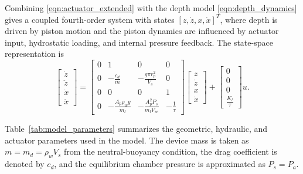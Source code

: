 ﻿\documentclass[subscriptcorrection,upint,varvw,barcolor=Goldenrod3,mathalfa=cal=euler,balance,hyphenate,french,pdf-a]{asmejour}
\begin{document}
Combining \eqref{eqn:actuator_extended} with the depth model \eqref{eqn:depth_dynamics} gives a coupled fourth-order system with states $[z,\dot{z},x,\dot{x}]^T$, where depth is driven by piston motion and the piston dynamics are influenced by actuator input, hydrostatic loading, and internal pressure feedback. The state-space representation is
\begin{equation}
    \label{eqn:state_space}
    \begin{bmatrix}\dot{z} \\ \ddot{z} \\ \dot{x} \\ \ddot{x}\end{bmatrix} =
    \begin{bmatrix}0 & 1 & 0 & 0 \\
0 & -\frac{c_d}{m} & -\frac{g\pi r_p^2}{V_s} & 0 \\
0 & 0 & 0 & 1 \\
0 & -\frac{A_p\rho_w g}{m_l} & -\frac{A_p^2P_s}{m_lV_{se}} & -\frac{1}{\tau}\end{bmatrix}
    \begin{bmatrix}z \\ \dot{z} \\ x \\ \dot{x}\end{bmatrix} +
    \begin{bmatrix}0 \\ 0 \\ 0 \\ \frac{K_l}{\tau}\end{bmatrix}u.
\end{equation}

Table~\ref{tab:model_parameters} summarizes the geometric, hydraulic, and actuator parameters used in the model. The device mass is taken as $m=m_d=\rho_w V_s$ from the neutral-buoyancy condition, the drag coefficient is denoted by $c_d$, and the equilibrium chamber pressure is approximated as $P_s=P_a$.
\end{document}

